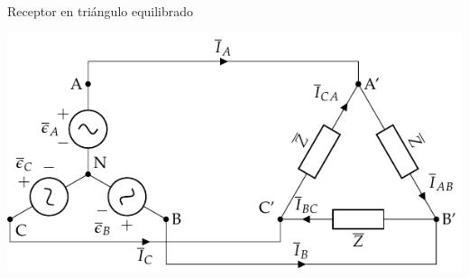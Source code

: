 \documentclass[aspectratio=169, usenames,svgnames,dvipsnames]{beamer}
\begin{document}

\begin{frame}{Receptor en triángulo equilibrado}
    \begin{center}
        \includegraphics[width=.9\linewidth]{../figs/TrianguloEquilibrado.pdf}
    \end{center}
\end{frame}

\end{document}
